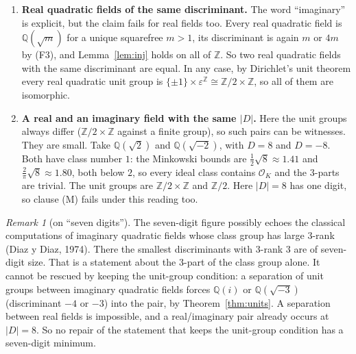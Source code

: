 \documentclass[11pt]{article}
\theoremstyle{definition}
\theoremstyle{remark}
\newtheorem{remark}[theorem]{Remark}
\newcommand{\Q}{\mathbb{Q}}
\newcommand{\Z}{\mathbb{Z}}
\newcommand{\OO}{\mathcal{O}}
\begin{document}
\begin{enumerate}
orders $6,4,2$. The discriminants involved are $-3,-4,-8$, with one digit, so clause (M), the
seven-digit minimum, fails under this reading too. Moreover, every witness pair must contain
$\Q(i)$ or $\Q(\sqrt{-3})$, since all other unit groups are $\{\pm1\}$.
\item \textbf{Real quadratic fields of the same discriminant.} The word ``imaginary'' is
explicit, but the claim fails for real fields too. Every real quadratic field is $\Q(\sqrt m)$
for a unique squarefree $m>1$, its discriminant is again $m$ or $4m$ by (F3), and
Lemma~\ref{lem:inj} holds on all of $\Z$. So two real quadratic fields with the same
discriminant are equal. In any case, by Dirichlet's unit theorem every real quadratic unit group
is $\{\pm1\}\times\varepsilon^{\Z}\cong\Z/2\times\Z$, so all of them are isomorphic.
\item \textbf{A real and an imaginary field with the same $|D|$.} Here the unit groups always
differ ($\Z/2\times\Z$ against a finite group), so such pairs can be witnesses. They are
small. Take $\Q(\sqrt2)$ and $\Q(\sqrt{-2})$, with $D=8$ and $D=-8$. Both have class number
$1$: the Minkowski bounds are $\tfrac12\sqrt8\approx1.41$ and
$\tfrac2\pi\sqrt8\approx1.80$, both below $2$, so every ideal class contains $\OO_K$ and the
$3$-parts are trivial. The unit groups are $\Z/2\times\Z$ and $\Z/2$. Here $|D|=8$ has one
digit, so clause (M) fails under this reading too.
\end{enumerate}

\begin{remark}[on ``seven digits'']
The seven-digit figure possibly echoes the classical computations of imaginary quadratic fields
whose class group has large $3$-rank (Diaz y Diaz, 1974). There the smallest discriminants with
$3$-rank $3$ are of seven-digit size. That is a statement about the $3$-part of the class group
alone. It cannot be rescued by keeping the unit-group condition: a separation of unit groups
between imaginary quadratic fields forces $\Q(i)$ or $\Q(\sqrt{-3})$ (discriminant $-4$ or
$-3$) into the pair, by Theorem~\ref{thm:units}. A separation between real fields is
impossible, and a real/imaginary pair already occurs at $|D|=8$. So no repair of the statement
that keeps the unit-group condition has a seven-digit minimum.
\end{remark}
\end{document}
